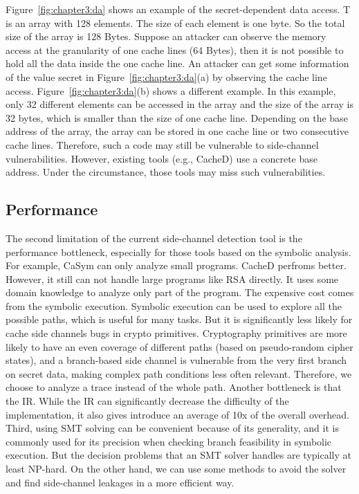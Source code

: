 Figure~\ref{fig:chapter3:da} shows an example of the secret-dependent data access. \textsf{T} is an array with 128 elements. The size of each element is one byte. So the total size of the array is 128 Bytes. Suppose an attacker can observe the memory access at the granularity of one cache lines (64 Bytes), then it is not possible to hold all the data inside the one cache line. An attacker can get some information of the value \textsf{secret} in Figure~\ref{fig:chapter3:da}(a) by observing the cache line access. Figure~\ref{fig:chapter3:da}(b) shows a different example. In this example, only 32 different elements can be accessed in the array and the size of the array is 32 bytes, which is smaller than the size of one cache line. Depending on the base address of the array, the array can be stored in one cache line or two consecutive cache lines. Therefore, such a code may still be vulnerable to side-channel vulnerabilities. However, existing tools (e.g., CacheD) use a concrete base address. Under the circumstance, those tools may miss such vulnerabilities.

\subsection{Performance}
The second limitation of the current side-channel detection tool is the performance bottleneck, especially for those tools based on the symbolic analysis. For example, CaSym can only analyze small programs. CacheD perfroms better. However, it still can not handle large programs like RSA directly. It uses some domain knowledge to analyze only part of the program. The expensive cost comes from the symbolic execution. Symbolic execution can be used to explore all the possible paths, which is useful for many tasks. But it is significantly less likely for cache side channels bugs in crypto primitives. Cryptography primitives are more likely to have an even coverage of different paths (based on pseudo-random cipher states), and a branch-based side channel is vulnerable from the very first branch on secret data, making complex path conditions less often relevant. Therefore, we choose to analyze a trace instead of the whole path. Another bottleneck is that the IR. While the IR can significantly decrease the difficulty of the implementation, it also gives introduce an average of 10x of the overall overhead. Third, using SMT solving can be convenient because of its generality, and it is commonly used for its precision when checking branch feasibility in symbolic execution. But the decision problems that an SMT solver handles are typically at least NP-hard. On the other hand, we can use some methods to avoid the solver and find side-channel leakages in a more efficient way.

